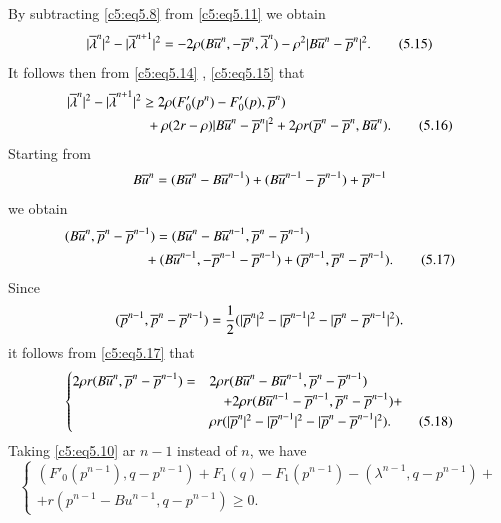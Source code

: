 By subtracting \eqref{c5:eq5.8} from \eqref{c5:eq5.11} we obtain 
\begin{equation}
 |\overline{\lambda}^{n}|^2 - |\overline{\lambda}^{n + 1}|^2 = - 2 \rho (B \overline{u}^{n},
 -\overline{p}^{n}, \overline{\lambda}^{n}) -\rho^2 | B \overline{u}^{n}-
 \overline{p}^{n}|^2. \tag{5.15}\label{c5:eq5.15} 
 \end{equation}
 It follows then from \eqref{c5:eq5.14} ,  \eqref{c5:eq5.15} that 
 \begin{align*}
&|\overline{\lambda}^{n}|^2 - |\overline{\lambda}^{n+1}|^2 \geq 2 \rho (F'_0 (p^n) - F'_0
(p) , \overline{p}^{n}) \\
&\hspace{2cm}+ \rho (2r - \rho) | B \overline{u}^{n}- \overline{p}^{n}|^2 + 2 \rho r
(\overline{p}^{n} - \overline{p}^{n},  B \overline{u}^{n}). \tag{5.16}\label{c5:eq5.16} 
 \end{align*}
 Starting from 
 $$
 B \overline{u}^{n} = (B \overline{u}^{n} - B\overline{u}^{n - 1}) + (B\overline{u}^{n - 1} -
 \overline{p}^{n - 1}) + \overline{p}^{n - 1} 
 $$
 we obtain 
 \begin{align*}
& (B\overline{u}^{n}, \overline{p}^{n} - \overline{p}^{n - 1}) = (B\overline{u}^{n} -
   B\overline{u}^{n- 1}, \overline{p}^{n} -
   \overline{p}^{n - 1})\\ 
  & \hspace{2cm} + (B\overline{u}^{n - 1}, -\overline{p}^{n - 1} - \overline{p}^{n-1}) +
   (\overline{p}^{n-1},  \overline{p}^{n} - \overline{p}^{n-1}). \tag{5.17}\label{c5:eq5.17} 
 \end{align*}
 Since 
 $$
 (\overline{p}^{n - 1}, \overline{p}^{n} - \overline{p}^{n - 1}) = \frac{1}{2} (| \overline{p}^{n}|^2-|
 \overline{p}^{n - 1}|^2 - |\overline{p}^{n} - \overline{p}^{n-1}|^2). 
 $$
 it follows from \eqref{c5:eq5.17} that 
 \begin{equation}
\begin{cases}
2 \rho r (B\overline{u}^{n},  \overline{p}^{n} - \overline{p}^{n - 1}) = & 2 \rho r
(B\overline{u}^{n} - B\overline{u}^{n - 1},  \overline{p}^{n} 
- \overline{p}^{n -1})\\ 
& \quad+ 2 \rho r (B\overline{u}^{n-1} - \overline{p}^{n-1},  \overline{p}^{n}
- \overline{p}^{ n - 1})+ \\ 
& \rho r (|\overline{p}^{n}|^2 - |\overline{p}^{n-1}|^2 - |\overline{p}^{n}- \overline{p}^{n
  -1}|^2).\tag{5.18}\label{c5:eq5.18} 
\end{cases}
 \end{equation} 
 Taking \eqref{c5:eq5.10} ar $n-1$ instead of $n$,  we have 
 \begin{equation}
\begin{cases}
(F'_0 (p^{n-1}),  q - p^{n-1}) + F_1 (q) - F_1 (p^{n - 1}) -
  (\lambda^{n - 1}, q - p^{n-1})+ \\ 
  + r (p^{n-1} - Bu^{n-1},  q - p^{n - 1}) \geq 0. \tag{5.19}\label{c5:eq5.19}
\end{cases}
 \end{equation}\pageoriginale  
